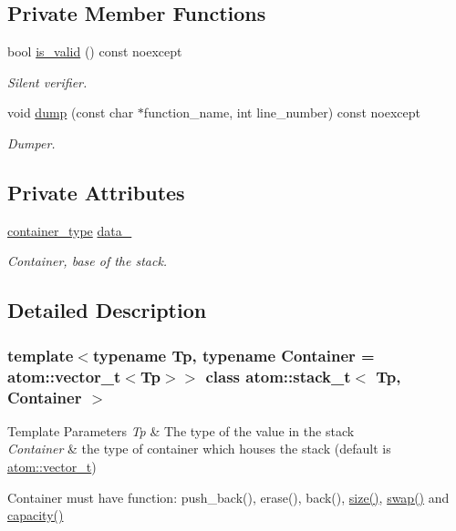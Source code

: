 \subsection*{Private Member Functions}
\begin{DoxyCompactItemize}
\item 
bool \hyperlink{classatom_1_1stack__t_aad558411c92e7c1776ad82be0ea876ee}{is\+\_\+valid} () const noexcept
\begin{DoxyCompactList}\small\item\em Silent verifier. \end{DoxyCompactList}\item 
void \hyperlink{classatom_1_1stack__t_a424f65300ba04f8000ec6bf315595d1b}{dump} (const char $\ast$function\+\_\+name, int line\+\_\+number) const noexcept
\begin{DoxyCompactList}\small\item\em Dumper. \end{DoxyCompactList}\end{DoxyCompactItemize}
\subsection*{Private Attributes}
\begin{DoxyCompactItemize}
\item 
\mbox{\label{classatom_1_1stack__t_a5c58ed4bf4abd24da5d98f28f085dff6}} 
\hyperlink{classatom_1_1stack__t_ab18a4ad6c754ddb70ce585528823eac2}{container\+\_\+type} \hyperlink{classatom_1_1stack__t_a5c58ed4bf4abd24da5d98f28f085dff6}{data\+\_\+}
\begin{DoxyCompactList}\small\item\em Container, base of the stack. \end{DoxyCompactList}\end{DoxyCompactItemize}


\subsection{Detailed Description}
\subsubsection*{template$<$typename Tp, typename Container = atom\+::vector\+\_\+t$<$\+Tp$>$$>$\newline
class atom\+::stack\+\_\+t$<$ Tp, Container $>$}


\begin{DoxyTemplParams}{Template Parameters}
{\em Tp} & The type of the value in the stack \\
\hline
{\em Container} & the type of container which houses the stack (default is \hyperlink{classatom_1_1vector__t}{atom\+::vector\+\_\+t})\\
\hline
\end{DoxyTemplParams}
Container must have function\+: push\+\_\+back(), erase(), back(), \hyperlink{classatom_1_1stack__t_a7ae2d64181c0dcc03a54ca5df4c0de75}{size()}, \hyperlink{classatom_1_1stack__t_a05922491d108df9aeae30a5da18d7192}{swap()} and \hyperlink{classatom_1_1stack__t_ace44f2ab1b95b156fd30e25f26f8065e}{capacity()} 


